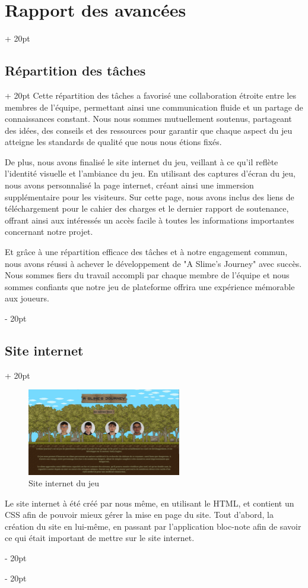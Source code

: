 \documentclass[a4paper, 12pt, twoside]{article}
\newcommand{\ind}[1][20pt]{\advance\leftskip + #1}
\newcommand{\deind}[1][20pt]{\advance\leftskip - #1}
\newenvironment{indt}[2][20pt]{#2 \par \ind[#1]}{\par \deind} %
\begin{document}
\begin{indt}{\section{Rapport des avancées}}
\begin{indt}{\subsection{Répartition des tâches}}
            Cette répartition des tâches a favorisé une collaboration étroite entre les membres de l'équipe, permettant ainsi une communication fluide et un partage de connaissances constant. Nous nous sommes mutuellement soutenus, partageant des idées, des conseils et des ressources pour garantir que chaque aspect du jeu atteigne les standards de qualité que nous nous étions fixés.

            De plus, nous avons finalisé le site internet du jeu, veillant à ce qu'il reflète l'identité visuelle et l'ambiance du jeu. En utilisant des captures d'écran du jeu, nous avons personnalisé la page internet, créant ainsi une immersion supplémentaire pour les visiteurs. Sur cette page, nous avons inclus des liens de téléchargement pour le cahier des charges et le dernier rapport de soutenance, offrant ainsi aux intéressés un accès facile à toutes les informations importantes concernant notre projet.

            Et grâce à une répartition efficace des tâches et à notre engagement commun, nous avons réussi à achever le développement de "A Slime's Journey" avec succès. Nous sommes fiers du travail accompli par chaque membre de l'équipe et nous sommes confiants que notre jeu de plateforme offrira une expérience mémorable aux joueurs.
        \end{indt}

        \newpage

        \begin{indt}{\subsection{Site internet}}
            \begin{figure}[h]
                \centering
                \includegraphics[width=0.6\textwidth]{Site2.png}
                \caption{Site internet du jeu}
                \label{fig:mesh1}
            \end{figure}

            Le site internet à été créé par nous même, en utilisant le HTML, et contient un CSS afin de pouvoir mieux gérer la mise en page du site. Tout d’abord, la création du site en lui-même, en passant par l’application bloc-note afin de savoir ce qui était important de mettre sur le site internet.


\end{indt}
\end{indt}
\end{document}
